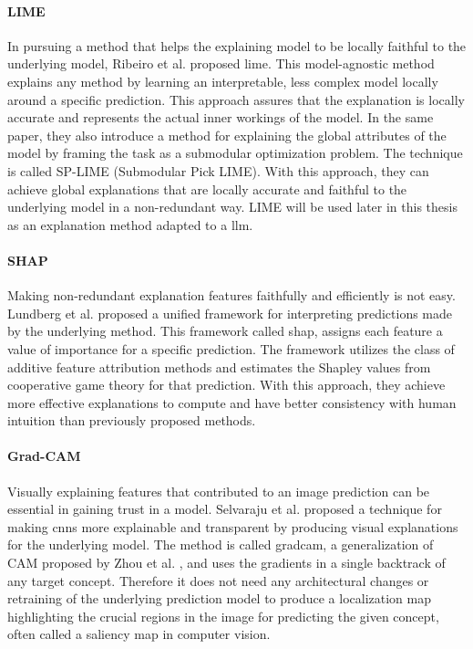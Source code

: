 \paragraph{LIME\\}
In pursuing a method that helps the explaining model to be locally faithful to the underlying model, Ribeiro et al. \cite{ribeiroWhyShouldTrust2016} proposed \gls{lime}. This model-agnostic method explains any method by learning an interpretable, less complex model locally around a specific prediction. This approach assures that the explanation is locally accurate and represents the actual inner workings of the model. 
In the same paper, they also introduce a method for explaining the global attributes of the model by framing the task as a submodular optimization problem. The technique is called SP-LIME (Submodular Pick LIME). With this approach, they can achieve global explanations that are locally accurate and faithful to the underlying model in a non-redundant way. LIME will be used later in this thesis as an explanation method adapted to a \gls{llm}.

\paragraph{SHAP\\}
Making non-redundant explanation features faithfully and efficiently is not easy. Lundberg et al. \cite{lundbergUnifiedApproachInterpreting2017} proposed a unified framework for interpreting predictions made by the underlying method. This framework called \gls{shap}, assigns each feature a value of importance for a specific prediction. The framework utilizes the class of additive feature attribution methods and estimates the Shapley %
values from cooperative game theory for that prediction. With this approach, they achieve more effective explanations to compute and have better consistency with human intuition than previously proposed methods.  


\paragraph{Grad-CAM\\}
Visually explaining features that contributed to an image prediction can be essential in gaining trust in a model. Selvaraju et al. \cite{selvarajuGradCAMVisualExplanations2020} proposed a technique for making \glspl{cnn} more explainable and transparent by producing visual explanations for the underlying model. The method is called \gls{gradcam}, a generalization of CAM proposed by Zhou et al. \cite{zhouLearningDeepFeatures2016}, and uses the gradients in a single backtrack of any target concept. Therefore it does not need any architectural changes or retraining of the underlying prediction model to produce a localization map highlighting the crucial regions in the image for predicting the given concept, often called a saliency map in computer vision.

